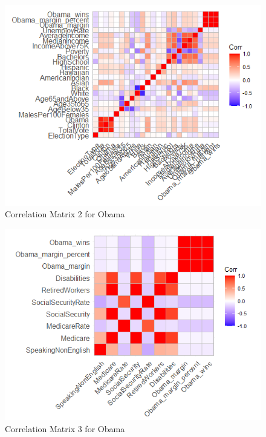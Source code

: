 \documentclass[11pt]{article}
\begin{document}
\begin{figure}[H]
    \centering
    \includegraphics[width=0.90\columnwidth]{assets/oc2.PNG}
    \caption{Correlation Matrix 2 for Obama}
    \label{lr}
\end{figure}

\begin{figure}[H]
    \centering
    \includegraphics[width=0.90\columnwidth]{assets/oc3.PNG}
    \caption{Correlation Matrix 3 for Obama}
    \label{lr}
\end{figure}
\end{document}
